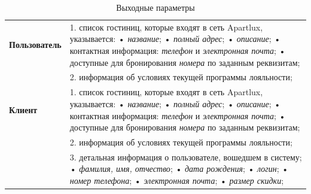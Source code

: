 \begin{longtable}{|p{0.5cm}|p{15.5cm}|}
	\caption{Выходные параметры}
	\label{tbl:output-data} \\
	\hline
	
	\begin{rotatebox}[origin=r]{90}
		{ \textbf{Пользователь}}
	\end{rotatebox} 
	& 
	1. список гостиниц, которые входят в сеть Apartlux, указывается: \newline
	• \textit{название}; \newline
	• \textit{полный адрес}; \newline
	• \textit{описание}; \newline
	• контактная информация: \textit{телефон} и \textit{электронная почта}; \newline
	• доступные для бронирования \textit{номера} по заданным реквизитам; \\
	\cline{2-2}
	&
	2. информация об условиях текущей программы лояльности; \\
	\hline
	
	\begin{rotatebox}[origin=r]{90}
		{ \textbf{Клиент}}
	\end{rotatebox} 
	& 
	1. список гостиниц, которые входят в сеть Apartlux, указывается: \newline
	• \textit{название}; \newline
	• \textit{полный адрес}; \newline
	• \textit{описание}; \newline
	• контактная информация: \textit{телефон} и \textit{электронная почта}; \newline
	• доступные для бронирования \textit{номера} по заданным реквизитам; \\
	\cline{2-2}
	
	&
	2. информация об условиях текущей программы лояльности; \\
	\cline{2-2}
	
	&
	3. детальная информация о пользователе, вошедшем в систему; \newline
	• \textit{фамилия, имя, отчество}; \newline
	• \textit{дата рождения}; \newline
	• \textit{логин}; \newline
	• \textit{номер телефона}; \newline
	• \textit{электронная почта}; \newline
	• \textit{размер скидки}; \\
	\cline{2-2}
	

\end{longtable}

